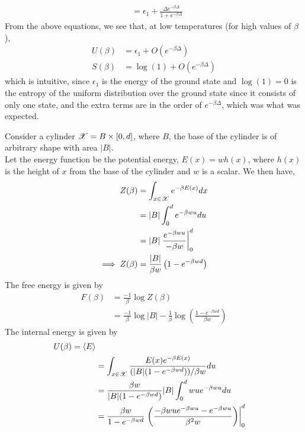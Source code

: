 \documentclass[letterpaper,english,12pt]{article}
\begin{document}
\begin{exmp}
\begin{align}
	&= \epsilon_1 + \frac{\Delta e^{-\beta \Delta}}{1 + e^{-\beta \Delta}}
\end{align}
From the above equations, we see that, at low temperatures (for high values of $\beta$),
\begin{align}
U(\beta) &= \epsilon_1 + O(e^{-\beta \Delta}) \\
S(\beta) &= \log (1) + O(e^{-\beta \Delta})
\end{align}
which is intuitive, since $\epsilon_1$ is the energy of the ground state and $\log(1) = 0$ is the entropy of the uniform distribution over the ground state since it consists of only one state, and the extra terms are in the order of $e^{-\beta \Delta}$, which was what was expected.
\end{exmp}
\begin{exmp}[Cylinder]
Consider a cylinder $\mathscr{X} = B \times [0,d]$, where $B$, the base of the cylinder is of arbitrary shape with area $|B|$.\\
Let the energy function be the potential energy, $E(x) = wh(x)$, where $h(x)$ is the height of $x$ from the base of the cylinder and $w$ is a scalar. We then have,
\begin{align}
Z(\beta) &= \int_{x \in \mathscr{X}} e^{-\beta E(x)} dx \nonumber \\
	&= |B| \int_0^d e^{-\beta w u} du \nonumber \\
	&= |B| \left. \frac{e^{-\beta w u}}{- \beta w} \right|_0^d \nonumber \\
\implies Z(\beta) &= \frac{|B|}{\beta w} \left( 1 - e^{-\beta w d} \right)
\end{align}
The free energy is given by
\begin{align}
F(\beta) &= \frac{-1}{\beta} \log Z(\beta) \nonumber \\
	&= \frac{-1}{\beta} \log |B| - \frac{1}{\beta} \log \left( \frac{1 - e^{-\beta wd}}{\beta w} \right)
\end{align}
The internal energy is given by
\begin{align}
U(\beta) = \left\langle E \right\rangle \nonumber \\
	&= \int_{x \in \sX} \frac{E(x) e^{- \beta E(x)}}{(|B|(1 - e^{-\beta wd}))/\beta w} du \nonumber \\
	&= \frac{\beta w}{|B|(1 - e^{-\beta wd})} |B| \int_0^d wu e^{-\beta wu} du \nonumber \\
	&= \frac{\beta w}{1 - e^{-\beta wd}} \left. \left( \frac{-\beta wu e^{-\beta wu} - e^{-\beta wu}}{\beta^2 w} \right) \right|_0^d \nonumber \\

\end{align}
\end{exmp}
\end{document}
